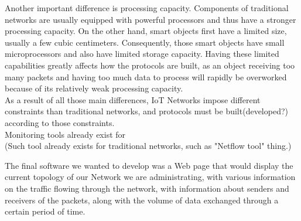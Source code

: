 Another important difference is processing capacity. Components of traditional networks are usually equipped with powerful processors and thus have a stronger processing capacity. On the other hand, smart objects first have a limited size, usually a few cubic centimeters. Consequently, those smart objects have small microprocessors and also have limited storage capacity. Having these limited capabilities greatly affects how the protocols are built, as an object receiving too many packets and having too much data to process will rapidly be overworked because of its relatively weak processing capacity. \\ 

As a result of all those main differences, IoT Networks impose different constraints than traditional networks, and protocols must be built(developed?) according to those constraints.\\

Monitoring tools already exist for \\

(Such tool already exists for traditional networks, such as "Netflow tool" thing.)

The final software we wanted to develop was a Web page that would display the current topology of our Network we are administrating, with various information on the traffic flowing through the network, with information about senders and receivers of the packets, along with the volume of data exchanged through a certain period of time. 